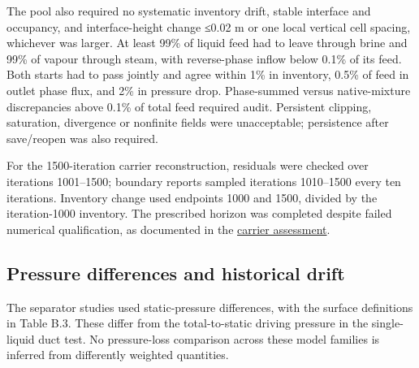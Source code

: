 The pool also required no systematic inventory drift, stable interface and occupancy, and interface-height change ≤0.02 m or one local vertical cell spacing, whichever was larger. At least 99\% of liquid feed had to leave through brine and 99\% of vapour through steam, with reverse-phase inflow below 0.1\% of its feed. Both starts had to pass jointly and agree within 1\% in inventory, 0.5\% of feed in outlet phase flux, and 2\% in pressure drop. Phase-summed versus native-mixture discrepancies above 0.1\% of total feed required audit. Persistent clipping, saturation, divergence or nonfinite fields were unacceptable; persistence after save/reopen was also required.

For the 1500-iteration carrier reconstruction, residuals were checked over iterations 1001--1500; boundary reports sampled iterations 1010--1500 every ten iterations. Inventory change used endpoints 1000 and 1500, divided by the iteration-1000 inventory. The prescribed horizon was completed despite failed numerical qualification, as documented in the \href{https://github.com/Shuhei-uni/P4P_knowledgeWiki/blob/main/Project/experiments/phase-10-single-inlet-mesh-convergence/replication1600-carrier-results.md}{carrier assessment}.

\subsection{Pressure differences and historical drift}

The separator studies used static-pressure differences, with the surface definitions in Table B.3. These differ from the total-to-static driving pressure in the single-liquid duct test. No pressure-loss comparison across these model families is inferred from differently weighted quantities.

